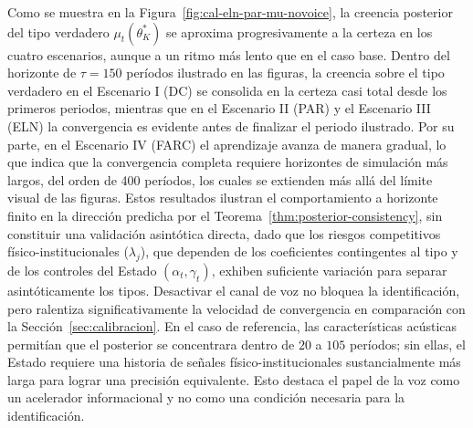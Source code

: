 \documentclass[pdflatex,sn-mathphys-ay]{sn-jnl}
\theoremstyle{thmstyleone}
\theoremstyle{thmstyletwo}
\theoremstyle{thmstylethree}
\newcommand{\1}{\mathbf{1}}
\begin{document}
Como se muestra en la Figura~\ref{fig:cal-eln-par-mu-novoice}, la creencia posterior del tipo verdadero $\mu_t(\theta_K^\ast)$ se aproxima progresivamente a la certeza en los cuatro escenarios, aunque a un ritmo más lento que en el caso base. Dentro del horizonte de $\tau = 150$ períodos ilustrado en las figuras, la creencia sobre el tipo verdadero en el Escenario I (DC) se consolida en la certeza casi total desde los primeros periodos, mientras que en el Escenario II (PAR) y el Escenario III (ELN) la convergencia es evidente antes de finalizar el periodo ilustrado. Por su parte, en el Escenario IV (FARC) el aprendizaje avanza de manera gradual, lo que indica que la convergencia completa requiere horizontes de simulación más largos, del orden de 400 períodos, los cuales se extienden más allá del límite visual de las figuras. Estos resultados ilustran el comportamiento a horizonte finito en la dirección predicha por el Teorema~\ref{thm:posterior-consistency}, sin constituir una validación asintótica directa, dado que los riesgos competitivos físico-institucionales ($\lambda_j$), que dependen de los coeficientes contingentes al tipo y de los controles del Estado $(\alpha_t, \gamma_t)$, exhiben suficiente variación para separar asintóticamente los tipos. Desactivar el canal de voz no bloquea la identificación, pero ralentiza significativamente la velocidad de convergencia en comparación con la Sección~\ref{sec:calibracion}. En el caso de referencia, las características acústicas permitían que el posterior se concentrara dentro de $20$ a $105$ períodos; sin ellas, el Estado requiere una historia de señales físico-institucionales sustancialmente más larga para lograr una precisión equivalente. Esto destaca el papel de la voz como un acelerador informacional y no como una condición necesaria para la identificación.
\end{document}
